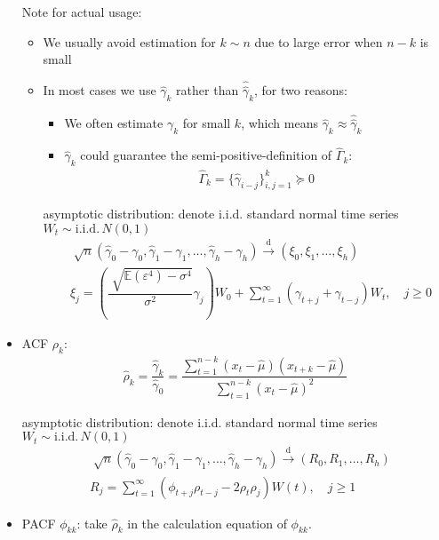 \begin{itemize}[topsep=2pt,itemsep=0pt]
        Note for actual usage:
        \begin{itemize}[topsep=2pt,itemsep=0pt]
            \item We usually avoid estimation for $ k\sim  n $ due to large error when $ n-k $ is small
            \item In most cases we use $ \hat{\gamma }_k $ rather than $ \hat{\hat{\gamma }}_k $, for two reasons:
            \begin{itemize}[topsep=2pt,itemsep=0pt]
                \item We often estimate $ \gamma _k $ for small $ k $, which means $ \hat{\gamma }_k\approx \hat{\hat{\gamma }}_k $
                \item $ \hat{\gamma }_k $ could guarantee the semi-positive-definition of $ \hat{\Gamma }_k $:
                \begin{align}
                    \hat{\Gamma }_k=\{\hat{\gamma }_{i-j}\}_{i,j=1}^k\succeq 0
                \end{align}                
            \end{itemize}
            
            asymptotic distribution: denote i.i.d. standard normal time series $ W_t\sim \mathrm{i.i.d.} \,N(0,1)  $
            \begin{align}
                &\sqrt[]{n}(\hat{\gamma }_0-\gamma _0,\hat{\gamma }_1-\gamma _1,\ldots,\hat{\gamma }_h-\gamma _h)\xrightarrow[]{\mathrm{d}} (\xi _0,\xi _1,\ldots,\xi _h)\\
                &\xi _j=(\dfrac{\sqrt[]{\mathbb{E}\left( \varepsilon ^4 \right) -\sigma ^4}}{\sigma ^2}\gamma _j)W_0+\sum_{t=1}^\infty (\gamma _{t+j}+\gamma _{t-j})W_t,\quad j\geq 0
            \end{align}
                
        \end{itemize}
        
            
        \item ACF $ \rho _k $:
        \begin{align}
            \hat{\rho }_k=\dfrac{\hat{\gamma }_k}{\hat{\gamma }_0}=\dfrac{\sum_{t=1}^{n-k}(x_t-\hat{\mu })(x_{t+k}-\hat{\mu })}{\sum_{t=1}^{n-k}(x_t-\hat{\mu })^2}
        \end{align}

        asymptotic distribution: denote i.i.d. standard normal time series $ W_t\sim \mathrm{i.i.d.} \,N(0,1)  $
        \begin{align}\label{EqaEstimationDistributionOfACF}
            &\sqrt[]{n}(\hat{\gamma }_0-\gamma _0,\hat{\gamma }_1-\gamma _1,\ldots,\hat{\gamma }_h-\gamma _h)\xrightarrow[]{\mathrm{d}} (R _0,R _1,\ldots,R _h)\\
            &R _j=\sum_{t=1}^\infty(\phi _{t+j}\rho _{t-j}-2\rho _t\rho _j)W(t),\quad j\geq 1
        \end{align}
        \item PACF $ \phi _{kk} $: take $ \hat{\rho }_k $ in the calculation equation of $ \phi _{kk} $.
    \end{itemize}
    
